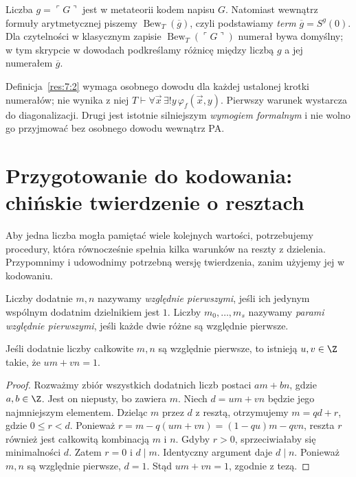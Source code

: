 \begin{uwaga}
Liczba $g=\ulcorner G\urcorner$ jest w metateorii kodem napisu $G$.
Natomiast wewnątrz formuły arytmetycznej piszemy
$\operatorname{Bew}_T(\overline g)$, czyli podstawiamy \emph{term}
$\overline g=S^g(0)$. Dla czytelności w klasycznym zapisie
$\operatorname{Bew}_T(\ulcorner G\urcorner)$ numerał bywa domyślny;
w tym skrypcie w dowodach podkreślamy różnicę między liczbą
$g$ a jej numerałem $\overline g$.
\end{uwaga}

\begin{uwaga}\label{res:7:3}
Definicja~\ref{res:7:2} wymaga osobnego dowodu dla każdej ustalonej krotki numerałów; nie wynika z niej $T\vdash\forall\vec x\,\exists!y\,\varphi_f(\vec x,y)$. Pierwszy warunek wystarcza do diagonalizacji. Drugi jest istotnie
silniejszym \emph{wymogiem formalnym} i nie wolno go przyjmować
bez osobnego dowodu wewnątrz PA.
\end{uwaga}


\section{Przygotowanie do kodowania: chińskie twierdzenie o resztach}
Aby jedna liczba mogła pamiętać wiele kolejnych wartości,
potrzebujemy procedury, która równocześnie spełnia kilka
warunków na reszty z dzielenia. Przypomnimy i udowodnimy
potrzebną wersję twierdzenia, zanim użyjemy jej w kodowaniu.

\begin{definicja}
Liczby dodatnie $m,n$ nazywamy \emph{względnie pierwszymi},
jeśli ich jedynym wspólnym dodatnim dzielnikiem jest $1$.
Liczby $m_0,\ldots,m_s$ nazywamy \emph{parami względnie pierwszymi},
jeśli każde dwie różne są względnie pierwsze.
\end{definicja}

\begin{lemat}\label{lem:arith-bezout}
Jeśli dodatnie liczby całkowite $m,n$ są względnie pierwsze,
to istnieją $u,v\in\Z$ takie, że $um+vn=1$.
\end{lemat}
\begin{proof}
Rozważmy zbiór wszystkich dodatnich liczb postaci $am+bn$,
gdzie $a,b\in\Z$. Jest on niepusty, bo zawiera $m$.
Niech $d=um+vn$ będzie jego najmniejszym elementem.
Dzieląc $m$ przez $d$ z resztą, otrzymujemy
$m=qd+r$, gdzie $0\le r<d$. Ponieważ
$r=m-q(um+vn)=(1-qu)m-qvn$, reszta $r$ również
jest całkowitą kombinacją $m$ i $n$. Gdyby $r>0$,
sprzeciwiałaby się minimalności $d$. Zatem $r=0$
i $d\mid m$. Identyczny argument daje $d\mid n$.
Ponieważ $m,n$ są względnie pierwsze, $d=1$.
Stąd $um+vn=1$, zgodnie z tezą.
\end{proof}

